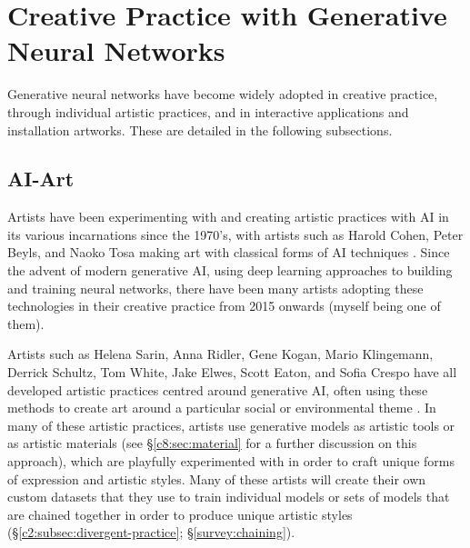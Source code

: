 \section{Creative Practice with Generative Neural Networks}

Generative neural networks have become widely adopted in creative practice, through individual artistic practices, and in interactive applications and installation artworks. 
These are detailed in the following subsections.

\subsection{AI-Art} 

Artists have been experimenting with and creating artistic practices with AI in its various incarnations since the 1970's, with artists such as Harold Cohen, Peter Beyls, and Naoko Tosa making art with classical forms of AI techniques \citep{grba2022deep}. 
Since the advent of modern generative AI, using deep learning approaches to building and training neural networks, there have been many artists adopting these technologies in their creative practice from 2015 onwards (myself being one of them). 

Artists such as Helena Sarin, Anna Ridler, Gene Kogan, Mario Klingemann, Derrick Schultz, Tom White, Jake Elwes, Scott Eaton, and Sofia Crespo have all developed artistic practices centred around generative AI, often using these methods to create art around a particular social or environmental theme \citep{grba2022deep}. 
In many of these artistic practices, artists use generative models as artistic tools or as artistic materials (see \S \ref{c8:sec:material} for a further discussion on this approach), which are playfully experimented with in order to craft unique forms of expression and artistic styles.
Many of these artists will create their own custom datasets that they use to train individual models or sets of models that are chained together in order to produce unique artistic styles (\S \ref{c2:subsec:divergent-practice}; \S \ref{survey:chaining}).

